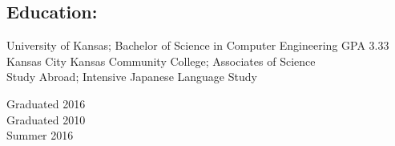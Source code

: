 \documentclass{res}
\begin{document}
\begin{resume}
\section{Education:}\vspace{5pt}
\begin{minipage}{0.8\linewidth}
	\begin{small}
		\begin{flushleft}
			University of Kansas; Bachelor of Science in Computer Engineering GPA 3.33\\Kansas City Kansas Community College; Associates of Science\\Study Abroad; Intensive Japanese Language Study
		\end{flushleft}
	\end{small}   
\end{minipage}
\begin{minipage}{0.2\linewidth}
	\begin{small}   
		\begin{flushright}
			Graduated 2016\\Graduated 2010\\Summer 2016
		\end{flushright}	     
	\end{small}   
\end{minipage}\vspace{-10pt}
 

\end{resume}
\end{document}
